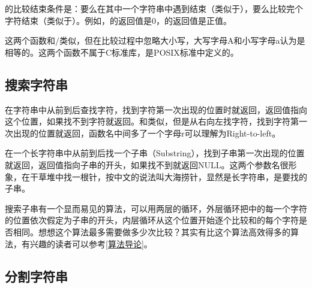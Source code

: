 的比较结束条件是：要么在其中一个字符串中遇到结束（类似于），要么比较完个字符结束（类似于）。例如，的返回值是0，的返回值是正值。




这两个函数和/类似，但在比较过程中忽略大小写，大写字母A和小写字母a认为是相等的。这两个函数不属于C标准库，是POSIX标准中定义的。


\subsection{搜索字符串}
%



在字符串中从前到后查找字符，找到字符第一次出现的位置时就返回，返回值指向这个位置，如果找不到字符就返回。和类似，但是从右向左找字符，找到字符第一次出现的位置就返回，函数名中间多了一个字母r可以理解为Right-to-left。




在一个长字符串中从前到后找一个子串（Substring），找到子串第一次出现的位置就返回，返回值指向子串的开头，如果找不到就返回NULL。这两个参数名很形象，在干草堆中找一根针，按中文的说法叫大海捞针，显然是长字符串，是要找的子串。



搜索子串有一个显而易见的算法，可以用两层的循环，外层循环把中的每一个字符的位置依次假定为子串的开头，内层循环从这个位置开始逐个比较和的每个字符是否相同。想想这个算法最多需要做多少次比较？其实有比这个算法高效得多的算法，有兴趣的读者可以参考\hyperlink{db.bi01.bibli.algorithm}{[算法导论]}。


\subsection{分割字符串}
%


